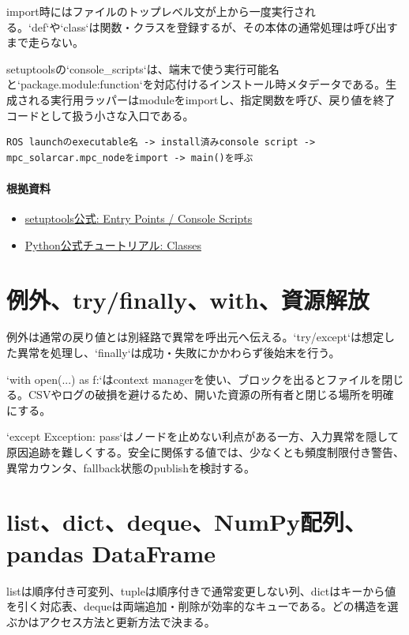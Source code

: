 \documentclass[a4paper,11pt]{article}
\begin{document}
import時にはファイルのトップレベル文が上から一度実行される。`def`や`class`は関数・クラスを登録するが、その本体の通常処理は呼び出すまで走らない。


setuptoolsの`console\_scripts`は、端末で使う実行可能名と`package.module:function`を対応付けるインストール時メタデータである。生成される実行用ラッパーはmoduleをimportし、指定関数を呼び、戻り値を終了コードとして扱う小さな入口である。


\begin{lstlisting}
ROS launchのexecutable名 -> install済みconsole script -> mpc_solarcar.mpc_nodeをimport -> main()を呼ぶ
\end{lstlisting}

\paragraph{根拠資料}
\begin{itemize}[leftmargin=1.6em]
\item \href{https://setuptools.pypa.io/en/latest/userguide/entry_point.html}{setuptools公式: Entry Points / Console Scripts}
\item \href{https://docs.python.org/3/tutorial/classes.html}{Python公式チュートリアル: Classes}
\end{itemize}

\section{例外、try/finally、with、資源解放}
例外は通常の戻り値とは別経路で異常を呼出元へ伝える。`try/except`は想定した異常を処理し、`finally`は成功・失敗にかかわらず後始末を行う。


`with open(...) as f:`はcontext managerを使い、ブロックを出るとファイルを閉じる。CSVやログの破損を避けるため、開いた資源の所有者と閉じる場所を明確にする。


`except Exception: pass`はノードを止めない利点がある一方、入力異常を隠して原因追跡を難しくする。安全に関係する値では、少なくとも頻度制限付き警告、異常カウンタ、fallback状態のpublishを検討する。



\section{list、dict、deque、NumPy配列、pandas DataFrame}
listは順序付き可変列、tupleは順序付きで通常変更しない列、dictはキーから値を引く対応表、dequeは両端追加・削除が効率的なキューである。どの構造を選ぶかはアクセス方法と更新方法で決まる。
\end{document}
